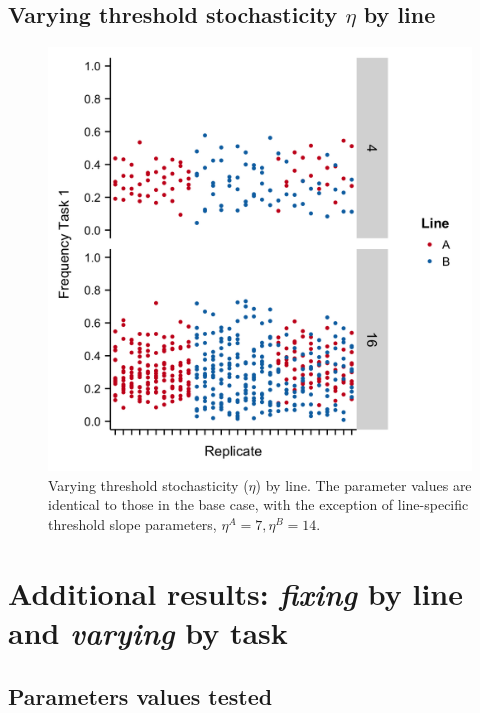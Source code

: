 \documentclass[11pt]{article}
\begin{document}
\begin{appendices}
\subsection{Varying threshold stochasticity $\eta$ by line}

\begin{figure}[H]
	\centering
	\includegraphics[width=.4\linewidth]{Diff_Etas_HighB.png}
	\caption{Varying threshold stochasticity ($\eta$) by line. The parameter values are identical to those in the base case, with the exception of line-specific threshold slope parameters, $\eta^A = 7, \eta^B = 14$.} 
	\label{fig:varyetaAB}
\end{figure}

\section{Additional results: \textit{fixing} by line and \textit{varying} by task}\label{sec:bytask}

\subsection{Parameters values tested}


\end{appendices}
\end{document}
